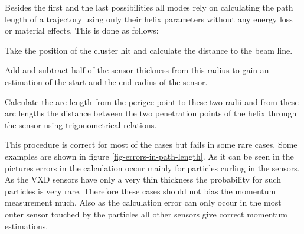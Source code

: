 Besides the first and the last possibilities all modes rely on calculating the path length of a trajectory using only their helix parameters without any energy loss or material effects. This is done as follows:
\begin{zlist}
 \item Take the position of the cluster hit and calculate the distance to the beam line.
 \item Add and subtract half of the sensor thickness from this radius to gain an estimation of the start and the end radius of the sensor.
 \item Calculate the arc length from the perigee point to these two radii and from these arc lengths the distance between the two penetration points of the helix through the sensor using trigonometrical relations.
\end{zlist}

This procedure is correct for most of the cases but fails in some rare cases. Some examples are shown in figure \ref{fig-errors-in-path-length}. As it can be seen in the pictures errors in the calculation occur mainly for particles curling in the sensors. As the VXD sensors have only a very thin thickness the probability for such particles is very rare. Therefore these cases should not bias the momentum measurement much. Also as the calculation error can only occur in the most outer sensor touched by the particles all other sensors give correct momentum estimations.

